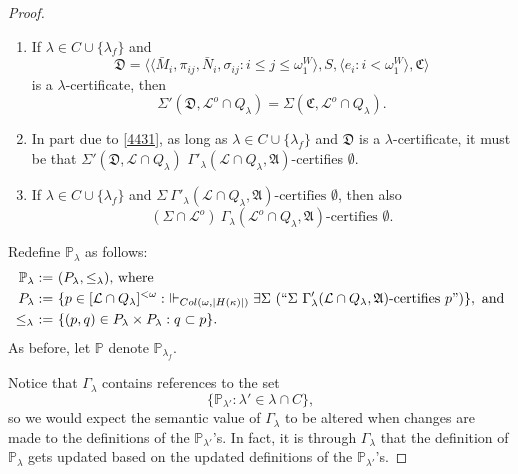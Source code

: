 \documentclass[12pt]{article}
\numberwithin{equation}{section}
\begin{document}
\begin{proof}
\begin{rem}\label{rem443}
\leavevmode
\begin{enumerate}[label=(\arabic*)]
    \item\label{443'1} If $\lambda \in C \cup \{\lambda_f\}$ and
    \begin{equation*}
        \mathfrak{D} = \langle \langle \bar{M}_i, \pi_{ij},  \bar{N}_i, \sigma_{ij} : i \leq j \leq \omega_1^{W} \rangle, S, \langle e_i : i < \omega_1^W \rangle, \mathfrak{C} \rangle
    \end{equation*}
    is a $\lambda$-certificate, then
    \begin{equation*}
        \Sigma'(\mathfrak{D}, \mathcal{L}^o \cap Q_{\lambda}) = \Sigma(\mathfrak{C}, \mathcal{L}^o \cap Q_{\lambda}) \text{.}
    \end{equation*}
    \item\label{443'2} In part due to \ref{4431}, as long as $\lambda \in C \cup \{\lambda_f\}$ and $\mathfrak{D}$ is a $\lambda$-certificate, it must be that $\Sigma'(\mathfrak{D}, \mathcal{L} \cap Q_{\lambda})$ $\Gamma'_{\lambda} (\mathcal{L} \cap Q_{\lambda}, \mathfrak{A})$-certifies $\emptyset$.
    \item\label{443'3} If $\lambda \in C \cup \{\lambda_f\}$ and $\Sigma \ \Gamma'_{\lambda} (\mathcal{L} \cap Q_{\lambda}, \mathfrak{A}) \text{-certifies } \emptyset$, then also
    \begin{equation*}
        (\Sigma \cap \mathcal{L}^o) \ \Gamma_{\lambda} (\mathcal{L}^o \cap Q_{\lambda}, \mathfrak{A}) \text{-certifies } \emptyset \text{.}
    \end{equation*}
\end{enumerate}
\end{rem}

Redefine $\mathbb{P}_{\lambda}$ as follows:
\begin{align*}
    \mathbb{P}_{\lambda} := \ & (P_{\lambda}, \leq_{\lambda}) \text{, where } \\
    P_{\lambda} := \ & \{p \in [\mathcal{L} \cap Q_{\lambda}]^{< \omega} : \ \Vdash_{Col(\omega, |H(\kappa)|)} \exists \Sigma \ (``\Sigma \ \Gamma'_{\lambda} (\mathcal{L} \cap Q_{\lambda}, \mathfrak{A}) \text{-certifies } p")\}, \text{ and} \\
    \leq_{\lambda} \ := \ & \{(p, q) \in P_{\lambda} \times P_{\lambda} : q \subset p\}.
\end{align*}
As before, let $\mathbb{P}$ denote $\mathbb{P}_{\lambda_f}$. 

Notice that $\Gamma_{\lambda}$ contains references to the set 
\begin{equation*}
    \{\mathbb{P}_{\lambda'} : \lambda' \in \lambda \cap C\} \text{,}
\end{equation*}
so we would expect the semantic value of $\Gamma_{\lambda}$ to be altered when changes are made to the definitions of the $\mathbb{P}_{\lambda'}$'s. In fact, it is through $\Gamma_{\lambda}$ that the definition of $\mathbb{P}_{\lambda}$ gets updated based on the updated definitions of the $\mathbb{P}_{\lambda'}$'s.


\end{proof}
\end{document}
